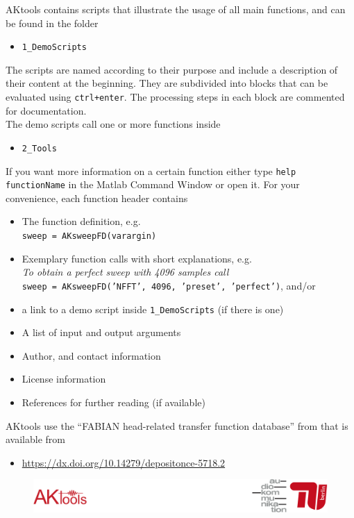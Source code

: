 \documentclass[11pt]{scrartcl}
\begin{document}
\noindent AKtools contains scripts that illustrate the usage of all main functions, and can be found in the folder
\begin{itemize}
	\item[] \texttt{1\_DemoScripts}
\end{itemize}
The scripts are named according to their purpose and include a description of their content at the beginning. They are subdivided into blocks that can be evaluated using \texttt{ctrl+enter}. The processing steps in
each block are commented for documentation.\\

\noindent The demo scripts call one or more functions inside
\begin{itemize}
	\item[] \texttt{2\_Tools}
\end{itemize}
If you want more information on a certain function either type \texttt{help functionName} in the Matlab Command Window or open it. For your convenience, each function header contains
\begin{itemize}
		\item The function definition, e.g.\\\texttt{sweep = AKsweepFD(varargin)}
		\item Exemplary function calls with short explanations, e.g.\\\emph{To obtain a perfect sweep with 4096 samples call}\\\texttt{sweep = AKsweepFD('NFFT', 4096, 'preset', 'perfect')}, and/or
		\item a link to a demo script inside \texttt{1\_DemoScripts} (if there is one)
		\item A list of input and output arguments
		\item Author, and contact information
		\item License information
		\item References for further reading (if available)
\end{itemize}

\noindent AKtools use the ``FABIAN head-related transfer function database'' from \cite{fabian_hrtf_misc} that is available from
\begin{itemize}
	\item \url{https://dx.doi.org/10.14279/depositonce-5718.2}
\end{itemize}

\vfill
\begin{figure}[b!]
  \center
  \includegraphics[width=1\textwidth]{logo_footer}
\end{figure}
\end{document}
